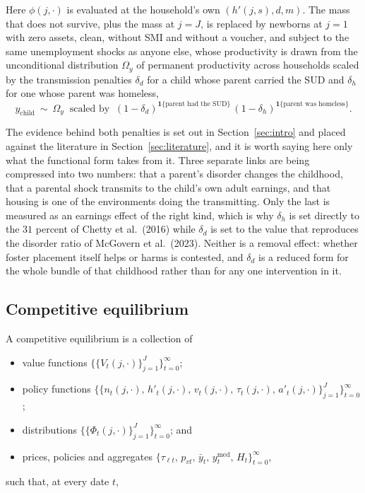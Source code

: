 \documentclass[10pt]{article}
\begin{document}
Here $\phi(j,\cdot)$ is evaluated at the household's own $(h'(j,s),d,m)$. The mass that
does not survive, plus the mass at $j=J$, is replaced by newborns at $j=1$ with
zero assets, clean, without SMI and without a voucher, and subject to the
same unemployment shocks as anyone else, whose
productivity is drawn from the unconditional distribution $\Omega_y$ of
permanent productivity across households scaled by the
transmission penalties $\delta_d$ for a child whose parent carried the SUD
and $\delta_h$ for one whose parent was homeless,
\begin{equation}\label{eq:fnewborn}
y_{\text{child}}\ \sim\ \Omega_y\ \text{ scaled by }\
(1-\delta_d)^{\mathbf{1}\{\text{parent had the SUD}\}}\,
(1-\delta_h)^{\mathbf{1}\{\text{parent was homeless}\}} .
\end{equation}

The evidence behind both penalties is set out in
Section~\ref{sec:intro} and placed against the literature in
Section~\ref{sec:literature}, and it is worth saying here only what the
functional form takes from it. Three separate links are being compressed into two
numbers: that a parent's disorder changes the childhood, that a parental shock
transmits to the child's own adult earnings, and that housing is one of the
environments doing the transmitting. Only the last is measured as an earnings
effect of the right kind, which is why $\delta_h$ is set directly to the $31$
percent of Chetty et al.\ (2016) while $\delta_d$ is set to the value
that reproduces the disorder ratio of McGovern et al.\ (2023). Neither is a
removal effect: whether foster placement itself helps or harms is contested, and
$\delta_d$ is a reduced form for the whole bundle of that childhood rather than for
any one intervention in it.


\subsection{Competitive equilibrium}

A competitive equilibrium is a collection of
\begin{itemize}\setlength{\itemsep}{0em}\setlength{\parskip}{0em}
\item value functions $\big\{\{V_t(j,\cdot)\}_{j=1}^{J}\big\}_{t=0}^{\infty}$;
\item policy functions
$\big\{\{n_t(j,\cdot),\,h'_t(j,\cdot),\,v_t(j,\cdot),\,\tau_t(j,\cdot),\,a'_t(j,\cdot)\}_{j=1}^{J}\big\}_{t=0}^{\infty}$;
\item distributions $\big\{\{\Phi_t(j,\cdot)\}_{j=1}^{J}\big\}_{t=0}^{\infty}$; and
\item prices, policies and aggregates
$\big\{\tau_{\ell t},\,p_{vt},\,\bar y_t,\,y^{\text{med}}_t,\,H_t\big\}_{t=0}^{\infty}$,
\end{itemize}
such that, at every date $t$,
\end{document}
